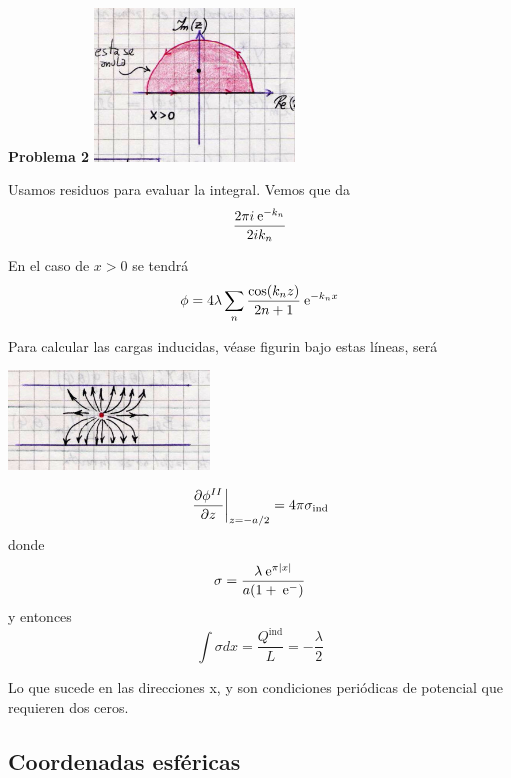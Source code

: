 \documentclass[10pt,oneside]{CBFT_book}
\begin{document}
\begin{ejemplo}{\bf Problema 2}
\includegraphics[width=0.4\textwidth]{images/fig_ft1_problema2_sep_D.jpg}

Usamos residuos para evaluar la integral. Vemos que da
\[
	\frac{2 \pi i \:\mathrm{e}^{-k_n} }{ 2 i k_n }
\]

En el caso de $x>0$ se tendrá
\[
	\phi = 4 \lambda \sum_n \frac{\cos(k_nz)}{2n +1} \:\mathrm{e}^{- k_n x}
\]

Para calcular las cargas inducidas, véase figurin bajo estas líneas, será

\includegraphics[width=0.4\textwidth]{images/fig_ft1_problema2_sep_E.jpg}

\[
	\left. \frac{\partial^{\hspace{-0.05em}} {\phi^{II}}}{\partial {z}^{\hspace{-0.05em}}} \right|_{z=-a/2} = 4 \pi \sigma_{\text{ind}}
\]
donde
\[
	\sigma = \frac{ \lambda \:\mathrm{e}^{ \pi |x|} }{a( 1 + \:\mathrm{e}^{-})} 
\]
y entonces
\[
	\int \sigma dx = \frac{Q^{\text{ind}}}{L} = - \frac{\lambda}{2}
\]

\end{ejemplo}



Lo que sucede en las direcciones x, y son condiciones periódicas de potencial que requieren
dos ceros.

\subsection{Coordenadas esféricas}
\end{document}
